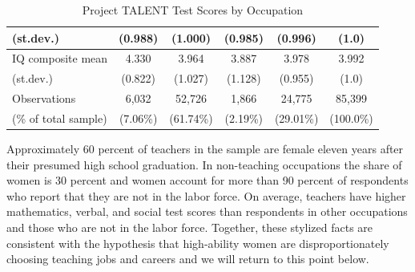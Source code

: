 \documentclass[onehalfspacing,11pt]{article}
\begin{document}
\begin{table}[h!]
\begin{tabular}{lccccc}
			\quad (st.dev.) & (0.988) & (1.000) & (0.985) & (0.996) & (1.0)\\
			\midrule
			IQ composite mean & 4.330 & 3.964 & 3.887 & 3.978 & 3.992\\
			\quad (st.dev.) & (0.822) & (1.027) & (1.128) & (0.955) & (1.0)\\
			\midrule
			Observations & 6,032 & 52,726 & 1,866 & 24,775 & 85,399\\
			\quad (\% of total sample) & (7.06\%) & (61.74\%) & (2.19\%) & (29.01\%) &(100.0\%)\\
			\bottomrule
		\end{tabular}
		\caption{Project TALENT Test Scores by Occupation}
		\label{tab:PTscores}
	\end{table}
	
	
	
	Approximately 60 percent of teachers in the sample are female eleven years after their presumed high school graduation. In non-teaching occupations the share of women is 30 percent and women account for more than 90 percent of respondents who report that they are not in the labor force. On average, teachers have higher mathematics, verbal, and social test scores than respondents in other occupations and those who are not in the labor force. Together, these stylized facts are consistent with the hypothesis that high-ability women are disproportionately choosing teaching jobs and careers and we will return to this point below.
	
\end{document}
